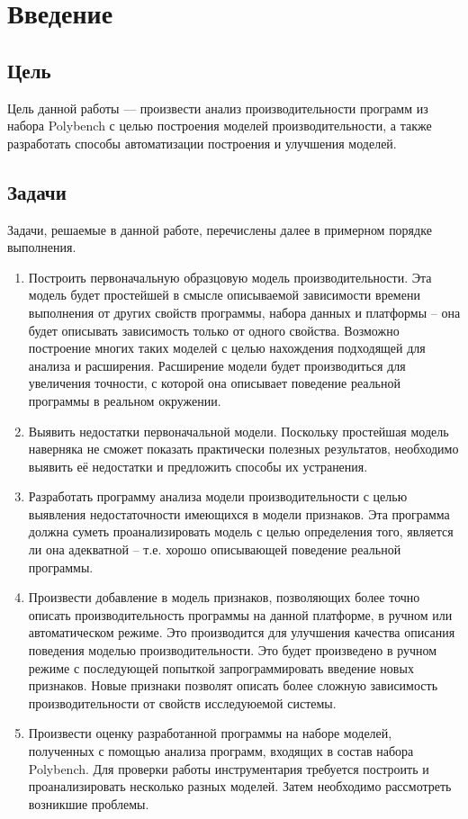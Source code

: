 \section*{Введение}
%
\subsection*{Цель}
%
Цель данной работы --- произвести анализ производительности программ из набора Polybench с целью построения моделей производительности, а также разработать способы автоматизации построения и улучшения моделей.

\subsection*{Задачи}
%
Задачи, решаемые в данной работе, перечислены далее в примерном порядке выполнения.
\begin{enumerate}
	\item Построить первоначальную образцовую модель производительности. Эта модель будет простейшей в смысле описываемой зависимости времени выполнения от других свойств программы, набора данных и платформы -- она будет описывать зависимость только от одного свойства. Возможно построение многих таких моделей с целью нахождения подходящей для анализа и расширения. Расширение модели будет производиться для увеличения точности, с которой она описывает поведение реальной программы в реальном окружении.
	\item Выявить недостатки первоначальной модели. Поскольку простейшая модель наверняка не сможет показать практически полезных результатов, необходимо выявить её недостатки и предложить способы их устранения.
	\item Разработать программу анализа модели производительности с целью выявления недостаточности имеющихся в модели признаков. Эта программа должна суметь проанализировать модель с целью определения того, является ли она адекватной -- т.е. хорошо описывающей поведение реальной программы.
	\item Произвести добавление в модель признаков, позволяющих более точно описать производительность программы на данной платформе, в ручном или автоматическом режиме. Это производится для улучшения качества описания поведения моделью производительности. Это будет произведено в ручном режиме с последующей попыткой запрограммировать введение новых признаков. Новые признаки позволят описать более сложную зависимость производительности от свойств исследуюемой системы.
	\item Произвести оценку разработанной программы на наборе моделей, полученных с помощью анализа программ, входящих в состав набора Polybench. Для проверки работы инструментария требуется построить и проанализировать несколько разных моделей. Затем необходимо рассмотреть возникшие проблемы.
\end{enumerate}